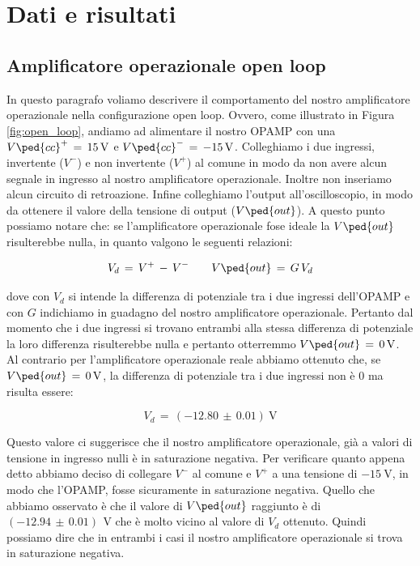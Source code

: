 \section*{Dati e risultati}

\subsection*{Amplificatore operazionale open loop}

In questo paragrafo voliamo descrivere il comportamento del nostro amplificatore operazionale nella configurazione open loop. Ovvero, come illustrato in Figura \ref{fig:open_loop}, andiamo ad alimentare il nostro OPAMP con una $V\ped{cc}^+\,=\,\SI{+15}{\volt}$ e $V\ped{cc}^-\,=\,\SI{-15}{\volt}$. Colleghiamo i due ingressi, invertente ($V^-$) e non invertente ($V^+$) al comune in modo da non avere alcun segnale in ingresso al nostro amplificatore operazionale. Inoltre non inseriamo alcun circuito di retroazione. Infine colleghiamo l'output all'oscilloscopio, in modo da ottenere il valore della tensione di output ($V\ped{out}$).
A questo punto possiamo notare che: se l'amplificatore operazionale fose ideale la $V\ped{out}$ risulterebbe nulla, in quanto valgono le seguenti relazioni:

\begin{equation}
	V_d\,=\,V^+\,-\,V^- \qquad V\ped{out}\,=\,G\,V_d
\end{equation}

dove con $V_d$ si intende la differenza di potenziale tra i due ingressi dell'OPAMP e con $G$ indichiamo in guadagno del nostro amplificatore operazionale. Pertanto dal momento che i due ingressi si trovano entrambi alla stessa differenza di potenziale la loro differenza risulterebbe nulla e pertanto otterremmo $V\ped{out}\,=\,\SI{0}{\volt}$.
Al contrario per l'amplificatore operazionale reale abbiamo ottenuto che, se $V\ped{out}\,=\,\SI{0}{\volt}$, la differenza di potenziale tra i due ingressi non è 0 ma risulta essere:

\begin{equation}
	V_d\,=\,(-12.80\,\pm\,0.01) \SI{}{\volt}
\end{equation}

Questo valore ci suggerisce che il nostro amplificatore operazionale, già a valori di tensione in ingresso nulli è in saturazione negativa. Per verificare quanto appena detto abbiamo deciso di collegare $V^-$ al comune e $V^+$ a una tensione di $\SI{-15}{\volt}$, in modo che l'OPAMP, fosse sicuramente in saturazione negativa. Quello che abbiamo osservato è che il valore di $V\ped{out}$ raggiunto è di $(-12.94\,\pm\,0.01)\,\SI{}{\volt}$ che è molto vicino al valore di $V_d$ ottenuto. Quindi possiamo dire che in entrambi i casi il nostro amplificatore operazionale si trova in saturazione negativa.

